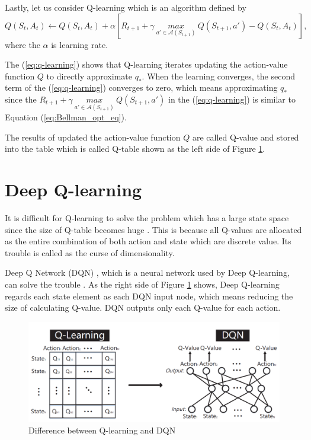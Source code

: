 Lastly, let us consider Q-learning \cite{korekara} \cite{sutton2018rl} \cite{watkins1989} which is an algorithm defined by
\begin{equation}
  \label{eq:q-learning}
  Q(S_{t},A_{t}) \leftarrow Q(S_{t},A_{t}) + \alpha [R_{t+1} + \gamma \ \underset{a' \in \mathcal{A}(S_{t+1})}{max} \ Q(S_{t+1},a') - Q(S_{t},A_{t})],
\end{equation}
where the $\alpha$ is learning rate.

The (\ref{eq:q-learning}) shows that Q-learning iterates updating the action-value function $Q$ to directly approximate $q_{*}$. When the learning converges, the second term of the (\ref{eq:q-learning}) converges to zero, which means approximating $q_{*}$ since the $R_{t+1} + \gamma \ \underset{a' \in \mathcal{A}(S_{t+1})}{max} \ Q(S_{t+1},a')$ in the (\ref{eq:q-learning}) is similar to Equation (\ref{eq:Bellman_opt_eq}).

The results of updated the action-value function $Q$ are called Q-value and stored into the table which is called Q-table shown as the left side of Figure \ref{fig:QvsDQN}.

\section{Deep Q-learning}
\label{sec:DQL}
It is difficult for Q-learning to solve the problem which has a large state space since the size of Q-table becomes huge \cite{zhang2019end}. This is because all Q-values are allocated as the entire combination of both action and state which are discrete value. Its trouble is called as the curse of dimensionality.

Deep Q Network (DQN) \cite{mnih2013playing}, which is a neural network used by Deep Q-learning, can solve the trouble \cite{zhang2019end}. As the right side of Figure \ref{fig:QvsDQN} shows, Deep Q-learning regards each state element as each DQN input node, which means reducing the size of calculating Q-value. DQN outputs only each Q-value for each action.

\begin{figure}[htbp]
  \centering
  \includegraphics[scale=0.4]{./Figure/QvsDQN.png}
  \caption{Difference between Q-learning and DQN \cite{zhang2019end}}
  \label{fig:QvsDQN}
\end{figure}

